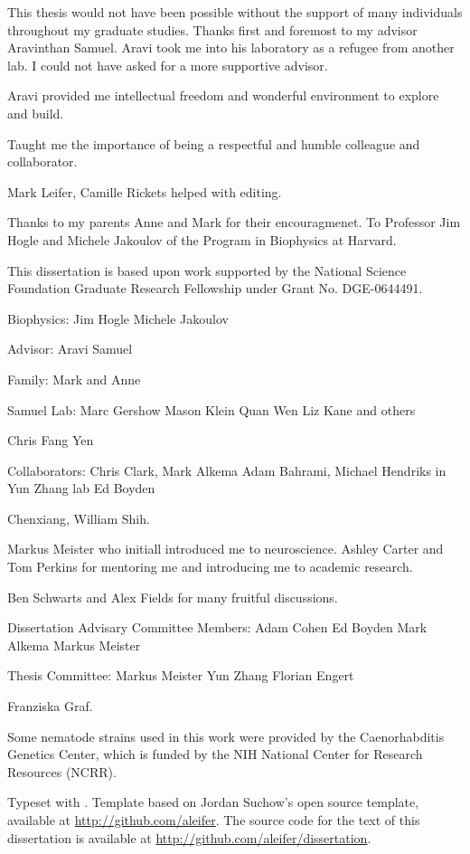 
This thesis would not have been possible without the support of many individuals throughout my graduate studies. Thanks first and foremost to my advisor Aravinthan Samuel. Aravi took me into his laboratory as a refugee from another lab. I could not have asked for a more supportive advisor. 

Aravi provided me intellectual freedom and wonderful environment to explore and build.

Taught me the importance of being a respectful and humble colleague and collaborator. 


Mark Leifer, Camille Rickets helped with editing. 


Thanks to my parents Anne and Mark for their encouragmenet. To Professor Jim Hogle and Michele Jakoulov of the Program in Biophysics at Harvard. 

This dissertation is based upon work supported by the National Science Foundation Graduate Research Fellowship under Grant No. DGE-0644491.

Biophysics:
  Jim Hogle
  Michele Jakoulov

Advisor:
  Aravi Samuel

Family:
  Mark and Anne

Samuel Lab:
  Marc Gershow
  Mason Klein
  Quan Wen
  Liz Kane and others

Chris Fang Yen

Collaborators:
   Chris Clark, Mark Alkema
   Adam Bahrami, Michael Hendriks in Yun Zhang lab
   Ed Boyden

Chenxiang, William Shih.
   

Markus Meister who initiall introduced me to neuroscience. 
Ashley Carter and Tom Perkins for mentoring me and introducing me to academic research. 

Ben Schwarts and Alex Fields for many fruitful discussions.

Dissertation Advisary Committee Members:
   Adam Cohen
   Ed Boyden
   Mark Alkema
   Markus Meister
   
Thesis Committee:
	Markus Meister
	Yun Zhang
	Florian Engert

Franziska Graf.

Some nematode strains used in this work were provided by the Caenorhabditis Genetics Center, which is funded by the NIH National Center for Research Resources (NCRR).

Typeset with \XeTeX. Template based on Jordan Suchow's open source template, available at \href{https://github.com/aleifer/LaTeX-template-for-Harvard-dissertation}{http://github.com/aleifer}.
The source code for the text of this dissertation is available at \url{http://github.com/aleifer/dissertation}.